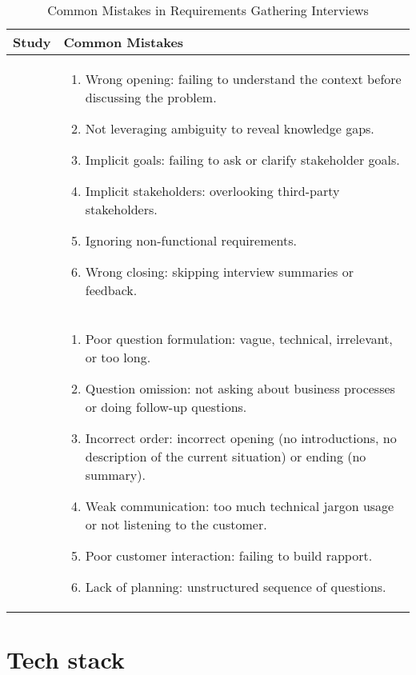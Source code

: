     
\begin{table}[h!]
    \centering
    \small
    \begin{tabular}{|p{}|p{}|}
    \hline
    \textbf{Study} & \textbf{Common Mistakes} \\ \hline
    
    \textcite{interviews1} & 
    \begin{enumerate}
        \item Wrong opening: failing to understand the context before discussing the problem.
        \item Not leveraging ambiguity to reveal knowledge gaps.
        \item Implicit goals: failing to ask or clarify stakeholder goals.
        \item Implicit stakeholders: overlooking third-party stakeholders.
        \item Ignoring non-functional requirements.
        \item Wrong closing: skipping interview summaries or feedback.
    \end{enumerate} \\ \hline
    
    \textcite{interviews2} & 
    \begin{enumerate}
        \item Poor question formulation: vague, technical, irrelevant, or too long.
        \item Question omission: not asking about business processes or doing follow-up questions.
        \item Incorrect order:  incorrect opening (no introductions, no description of the current situation) or ending (no summary).
        \item Weak communication: too much technical jargon usage or not listening to the customer.
        \item Poor customer interaction: failing to build rapport.
        \item Lack of planning: unstructured sequence of questions.
    \end{enumerate} \\ \hline
    
    \end{tabular}
    \caption{Common Mistakes in Requirements Gathering Interviews}
    \label{tab:common_mistakes}
\end{table}    

\section{Tech stack}

